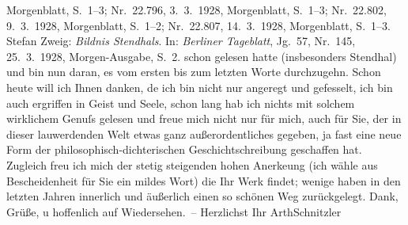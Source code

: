{{{                     Morgenblatt, S. 1–3; Nr. 22.796, 3. 3. 1928,
                     Morgenblatt, S. 1–3; Nr. 22.802, 9. 3. 1928,
                     Morgenblatt, S. 1–2; Nr. 22.807, 14. 3. 1928,
                     Morgenblatt, S. 1–3. Stefan Zweig: \emph{Bildnis Stendhals}. In: \emph{Berliner Tageblatt}, Jg. 57, Nr. 145, 25. 3. 1928,
                     Morgen-Ausgabe, S. 2. }}}\label{K_L03757-2} schon gelesen hatte (insbesonders Stendhal) und bin nun daran, es vom ersten bis zum letzten Worte durchzugehn. Schon
               heute will ich Ihnen danken, de{\geminationn} ich bin nicht nur
               angeregt und gefesselt, ich bin auch ergriffen in Geist und Seele, schon lang hab ich
               nichts mit solchem wirklichem Genuſs gelesen und freue mich nicht nur für mich, auch
               für Sie, der in dieser lauwerdenden Welt etwas ganz außerordentliches gegeben, ja
               fast eine neue Form der philosophisch-dichterischen {\pb}Geschichtschreibung geschaffen hat. Zugleich freu ich mich der stetig steigenden
               hohen Anerke{\geminationn}ung (ich wähle aus Bescheidenheit für Sie
               ein mildes Wort) die Ihr Werk findet; wenige haben in den letzten Jahren innerlich
               und äußerlich einen so schönen Weg zurückgelegt. Dank, Grüße, u hoffenlich auf
               Wiedersehen. –\pend
           \pstart Herzlichst Ihr \spacefill\mbox{ArthSchnitzler}\pend{}\endnumbering{}  \newcommand{\dateiname}{L03757}\newcommand{\titel}{Arthur Schnitzler an Stefan Zweig, 10. 5. 1928}\newcommand{\editorInnen}{Selma Jahnke und Martin Anton Müller}
